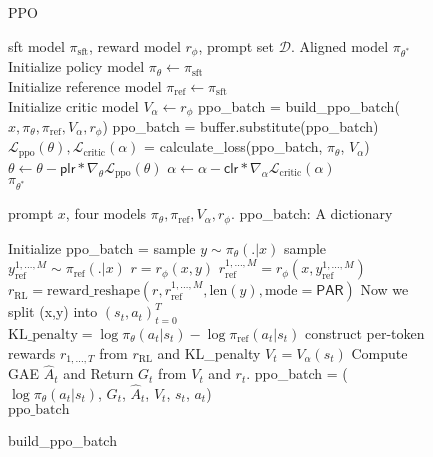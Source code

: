 \begin{figure*}[htbp]
    \centering
\begin{algorithm}[H]
\caption{PPO}
\label{alg:ppo}
\begin{algorithmic}[1]
\Require sft model $\pi_{\text{sft}}$, reward model $r_{\phi}$, prompt set $\mathcal{D}$.
\Ensure 
    Aligned model $\pi_{\theta^*}$\\
Initialize policy model $\pi_\theta\leftarrow\pi_{\text{sft}}$\\
Initialize reference model $\pi_{\text{ref}}\leftarrow\pi_{\text{sft}}$\\
Initialize critic model $V_\alpha\leftarrow r_{\phi}$
    \State ppo\_batch = build\_ppo\_batch($x,\pi_\theta,\pi_{\text{ref}},V_{\alpha},r_{\phi}$)
    \State ppo\_batch = buffer.substitute(ppo\_batch) 
    \State $\mathcal{L}_\text{ppo}(\theta),\mathcal{L}_\text{critic}(\alpha)$ = calculate\_loss(ppo\_batch, $\pi_\theta$, $V_\alpha$) 
    \State $\theta\leftarrow\theta-\mathsf{plr}*\nabla_{\theta}\mathcal{L}_\text{ppo}(\theta)$ 
    \State $\alpha\leftarrow\alpha-\mathsf{clr}*\nabla_{\alpha}\mathcal{L}_\text{critic}(\alpha)$ 
\EndFor\\
\Return $\pi_{\theta^*}$ 
\end{algorithmic}
\end{algorithm}
\begin{algorithm}[H]
\caption{build\_ppo\_batch}
\label{alg:build_ppo_batch}
\begin{algorithmic}[1]
\Require prompt $x$, four models $\pi_\theta,\pi_{\text{ref}},V_{\alpha},r_{\phi}$.
\Ensure ppo\_batch: A dictionary

\State Initialize ppo\_batch = {}
\State sample $y\sim\pi_\theta(.|x)$
\State sample $y_{\text{ref}}^{1,\ldots,M}\sim \pi_{\text{ref}}(.|x)$  
\State $r=r_\phi(x,y)$
\State $r_{\text{ref}}^{1,\ldots,M}=r_{\phi}(x, y_{\text{ref}}^{1,\ldots,M})$ 
\State $r_{\text{RL}}=\text{reward\_reshape}(r, r_{\text{ref}}^{1,\ldots,M}, \text{len}(y),\text{mode}=\mathsf{PAR})$
\State Now we split (x,y) into $(s_t,a_t)_{t=0}^T$
\State $\text{KL\_penalty} = \log\pi_{\theta}(a_t|s_t)-\log\pi_{\text{ref}}(a_t|s_t)$
\State construct per-token rewards $r_{1,\ldots,T}$ from $r_{\text{RL}}$ and KL\_penalty
\State $V_t = V_\alpha(s_t)$
\State Compute GAE $\hat{A}_t$ and Return $G_t$ from $V_t$ and $r_t$.
\State ppo\_batch = ($\log\pi_{\theta}(a_t|s_t)$, $G_t$, $\hat{A}_t$, $V_t$, $s_t$, $a_t$)
\\
\Return $\text{ppo\_batch}$ 
\end{algorithmic}
\end{algorithm}


\end{figure*}
